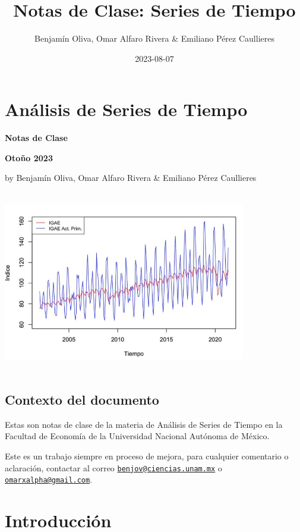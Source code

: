 \documentclass[
]{book}
\title{Notas de Clase: Series de Tiempo}
\author{Benjamín Oliva, Omar Alfaro Rivera \& Emiliano Pérez Caullieres}
\date{2023-08-07}
\begin{document}
\maketitle

{
\setcounter{tocdepth}{1}
\tableofcontents
}
\hypertarget{anuxe1lisis-de-series-de-tiempo}{%
\chapter*{Análisis de Series de Tiempo}\label{anuxe1lisis-de-series-de-tiempo}}

\textbf{Notas de Clase}

\textbf{Otoño 2023}

by Benjamín Oliva, Omar Alfaro Rivera \& Emiliano Pérez Caullieres

\includegraphics[width=4.16667in,height=3.125in]{Portada.png}

\hypertarget{contexto-del-documento}{%
\section*{Contexto del documento}\label{contexto-del-documento}}

Estas son notas de clase de la materia de Análisis de Series de Tiempo en la Facultad de Economía de la Universidad Nacional Autónoma de México.

Este es un trabajo siempre en proceso de mejora, para cualquier comentario o aclaración, contactar al correo \href{mailto:benjov@ciencias.unam.mx}{\nolinkurl{benjov@ciencias.unam.mx}} o \href{mailto:omarxalpha@gmail.com}{\nolinkurl{omarxalpha@gmail.com}}.

\hypertarget{introducciuxf3n}{%
\chapter{Introducción}\label{introducciuxf3n}}
\end{document}
